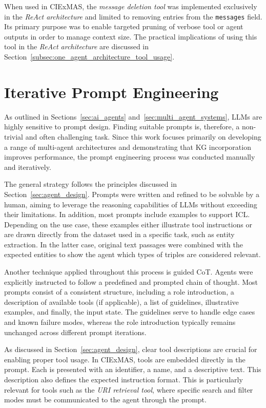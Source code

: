 \documentclass[a4paper,oneside,bibliography=totoc]{scrbook}
\begin{document}
When used in CIExMAS, the \textit{message deletion tool} was implemented exclusively in the \textit{\ac{ReAct} architecture} and limited to removing entries from the \texttt{messages} field. Its primary purpose was to enable targeted pruning of verbose tool or agent outputs in order to manage context size. The practical implications of using this tool in the \textit{\ac{ReAct} architecture} are discussed in Section~\ref{subsec:one_agent_architecture_tool_usage}.

\section{Iterative Prompt Engineering}
\label{sec:iterative_prompt_engineering}

As outlined in Sections~\ref{sec:ai_agents} and~\ref{sec:multi_agent_systems}, \acp{LLM} are highly sensitive to prompt design. Finding suitable prompts is, therefore, a non-trivial and often challenging task. Since this work focuses primarily on developing a range of multi-agent architectures and demonstrating that \ac{KG} incorporation improves performance, the prompt engineering process was conducted manually and iteratively.

The general strategy follows the principles discussed in Section~\ref{sec:agent_design}. Prompts were written and refined to be solvable by a human, aiming to leverage the reasoning capabilities of \acp{LLM} without exceeding their limitations. In addition, most prompts include examples to support \ac{ICL}. Depending on the use case, these examples either illustrate tool instructions or are drawn directly from the dataset used in a specific task, such as entity extraction. In the latter case, original text passages were combined with the expected entities to show the agent which types of triples are considered relevant.

Another technique applied throughout this process is guided \ac{CoT}. Agents were explicitly instructed to follow a predefined and prompted chain of thought. Most prompts consist of a consistent structure, including a role introduction, a description of available tools (if applicable), a list of guidelines, illustrative examples, and finally, the input state. The guidelines serve to handle edge cases and known failure modes, whereas the role introduction typically remains unchanged across different prompt iterations.

As discussed in Section~\ref{sec:agent_design}, clear tool descriptions are crucial for enabling proper tool usage. In CIExMAS, tools are embedded directly in the prompt. Each is presented with an identifier, a name, and a descriptive text. This description also defines the expected instruction format. This is particularly relevant for tools such as the \textit{\ac{URI} retrieval tool}, where specific search and filter modes must be communicated to the agent through the prompt.
\end{document}
